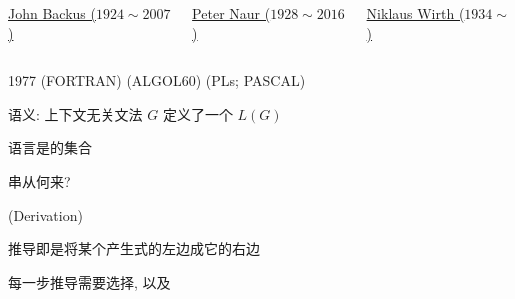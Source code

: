 \begin{frame}{}
  \begin{center}
  \end{center}

  \begin{columns}
      \begin{center}
        \href{https://en.wikipedia.org/wiki/John_Backus}{John Backus ($1924 \sim 2007$)}
      \end{center}
      \begin{center}
        \href{https://en.wikipedia.org/wiki/Peter_Naur}{Peter Naur ($1928 \sim 2016$)}
      \end{center}
      \begin{center}
        \href{https://en.wikipedia.org/wiki/Niklaus_Wirth}{Niklaus Wirth ($1934 \sim$)}
      \end{center}
  \end{columns}

  \pause
  \begin{center}
    1977 (FORTRAN)  (ALGOL60)  (PLs; PASCAL)
  \end{center}
\end{frame}

\begin{frame}{}
  \begin{center}
    语义: 上下文无关文法 $G$ 定义了一个 $L(G)$

    \pause
    \vspace{0.50cm}
    语言是的集合

    \vspace{0.30cm}
    串从何来?
  \end{center}
\end{frame}

\begin{frame}{}
  \begin{center}
    {\large {}} (Derivation)

    

    \vspace{0.50cm}
    推导即是将某个产生式的左边成它的右边

    \vspace{1.00cm}
    每一步推导需要选择, 以及
  \end{center}
\end{frame}

